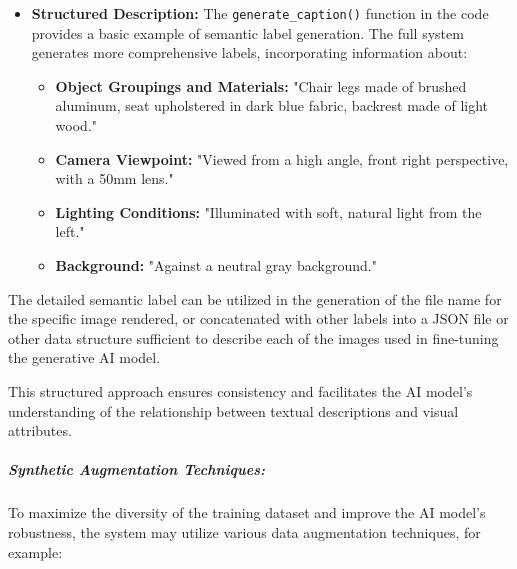 \documentclass[12pt]{report}
\begin{document}
\begin{itemize}
    \item \textbf{Structured Description:} The \texttt{generate\_caption()} function in the code provides a basic example of semantic label generation. The full system generates more comprehensive labels, incorporating information about:
    \begin{itemize}
        \item \textbf{Object Groupings and Materials:} "Chair legs made of brushed aluminum, seat upholstered in dark blue fabric, backrest made of light wood."
        \item \textbf{Camera Viewpoint:} "Viewed from a high angle, front right perspective, with a 50mm lens."
        \item \textbf{Lighting Conditions:} "Illuminated with soft, natural light from the left."
        \item \textbf{Background:} "Against a neutral gray background."
    \end{itemize}
\end{itemize}

The detailed semantic label can be utilized in the generation of the file name for the specific image rendered, or concatenated with other labels into a JSON file or other data structure sufficient to describe each of the images used in fine-tuning the generative AI model. 

This structured approach ensures consistency and facilitates the AI model's understanding of the relationship between textual descriptions and visual attributes.

\subparagraph{Synthetic Augmentation Techniques:} To maximize the diversity of the training dataset and improve the AI model's robustness, the system may utilize various data augmentation techniques, for example:
\end{document}
